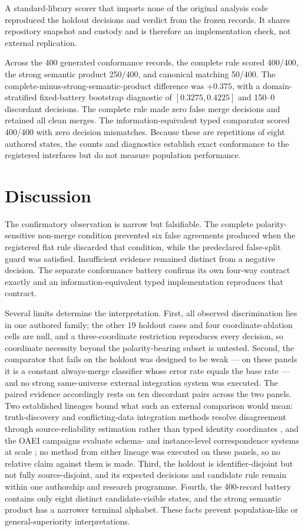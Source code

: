 A standard-library scorer that imports none of the original analysis code
reproduced the holdout decisions and verdict from the frozen records. It shares
repository snapshot and custody and is therefore an implementation check, not
external replication.

Across the 400 generated conformance records, the complete rule scored
400/400, the strong semantic product 250/400, and canonical matching
50/400. The complete-minus-strong-semantic-product difference was $+0.375$, with a
domain-stratified fixed-battery bootstrap diagnostic of $[0.3275,0.4225]$ and
150--0 discordant decisions. The complete rule made zero false merge decisions
and retained all clean merges. The information-equivalent typed comparator
scored 400/400 with zero decision mismatches. Because these are repetitions of
eight authored states, the counts and diagnostics establish exact conformance
to the registered interfaces but do not measure population performance.

\section{Discussion}

The confirmatory observation is narrow but falsifiable. The complete
polarity-sensitive non-merge condition prevented six false agreements produced
when the registered flat rule discarded that condition, while the predeclared
false-split guard was satisfied. Insufficient evidence remained distinct from
a negative decision. The separate conformance battery confirms its own
four-way contract exactly and an information-equivalent typed implementation
reproduces that contract.

Several limits determine the interpretation. First, all observed
discrimination lies in one authored family; the other 19 holdout cases and four
coordinate-ablation cells are null, and a three-coordinate restriction
reproduces every decision, so coordinate necessity beyond the polarity-bearing
subset is untested. Second, the comparator that fails on the
holdout was designed to be weak --- on these panels it is a constant
always-merge classifier whose error rate equals the base rate --- and no
strong same-universe external integration system was executed. The paired
evidence accordingly rests on ten discordant pairs across the two panels.
Two established lineages bound what such an external comparison would mean:
truth-discovery and conflicting-data integration methods resolve disagreement
through source-reliability estimation rather than typed identity coordinates
\cite{yin2008truthfinder,dong2009dependence,li2016truthsurvey}, and the OAEI
campaigns evaluate schema- and instance-level correspondence systems at scale
\cite{euzenat2011oaei}; no method from either lineage was executed on these
panels, so no relative claim against them is made. Third, the holdout is identifier-disjoint but
not fully source-disjoint, and its expected decisions and candidate rule remain
within one authorship and research programme. Fourth, the 400-record battery contains only
eight distinct candidate-visible states, and the strong semantic product
has a narrower terminal alphabet. These facts prevent population-like or
general-superiority interpretations.

